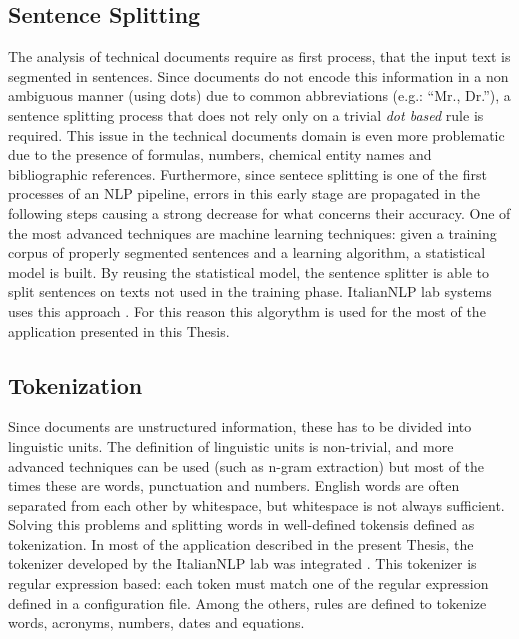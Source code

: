 \documentclass[]{book}
\begin{document}
\subsection{Sentence Splitting}\label{sentence-splitting}

The analysis of technical documents require as first process, that the
input text is segmented in sentences. Since documents do not encode this
information in a non ambiguous manner (using dots) due to common
abbreviations (e.g.: ``Mr., Dr.''), a sentence splitting process that
does not rely only on a trivial \emph{dot based} rule is required. This
issue in the technical documents domain is even more problematic due to
the presence of formulas, numbers, chemical entity names and
bibliographic references. Furthermore, since sentece splitting is one of
the first processes of an NLP pipeline, errors in this early stage are
propagated in the following steps causing a strong decrease for what
concerns their accuracy. One of the most advanced techniques are machine
learning techniques: given a training corpus of properly segmented
sentences and a learning algorithm, a statistical model is built. By
reusing the statistical model, the sentence splitter is able to split
sentences on texts not used in the training phase. ItalianNLP lab
systems uses this approach
\citep{dell2009ensemble, attardi2009reverse, attardi2009accurate}. For
this reason this algorythm is used for the most of the application
presented in this Thesis.

\subsection{Tokenization}\label{tokenization}

Since documents are unstructured information, these has to be divided
into linguistic units. The definition of linguistic units is
non-trivial, and more advanced techniques can be used (such as n-gram
extraction) but most of the times these are words, punctuation and
numbers. English words are often separated from each other by
whitespace, but whitespace is not always sufficient. Solving this
problems and splitting words in well-defined tokensis defined as
tokenization. In most of the application described in the present
Thesis, the tokenizer developed by the ItalianNLP lab was integrated
\citep{dell2009ensemble, attardi2009reverse, attardi2009accurate}. This
tokenizer is regular expression based: each token must match one of the
regular expression defined in a configuration file. Among the others,
rules are defined to tokenize words, acronyms, numbers, dates and
equations.
\end{document}
